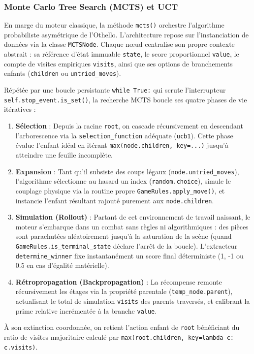 \documentclass[a4paper]{article}
\begin{document}
\subsubsection{Monte Carlo Tree Search (MCTS) et UCT}
En marge du moteur classique, la méthode \texttt{mcts()} orchestre l'algorithme probabiliste asymétrique de l'Othello. L'architecture repose sur l'instanciation de données via la classe \texttt{MCTSNode}. Chaque nœud centralise son propre contexte abstrait : sa référence d'état immuable \texttt{state}, le score proportionnel \texttt{value}, le compte de visites empiriques \texttt{visits}, ainsi que ses options de branchements enfants (\texttt{children} ou \texttt{untried\_moves}).

Répétée par une boucle persistante \texttt{while True:} qui scrute l'interrupteur \texttt{self.stop\_event.is\_set()}, la recherche MCTS boucle ses quatre phases de vie itératives :
\begin{enumerate}
    \item \textbf{Sélection} : Depuis la racine \texttt{root}, on cascade récursivement en descendant l'arborescence via la \texttt{selection\_function} adéquate (\texttt{ucb1}). Cette phase évalue l'enfant idéal en itérant \texttt{max(node.children, key=...)} jusqu'à atteindre une feuille incomplète.
    \item \textbf{Expansion} : Tant qu'il subsiste des coups légaux (\texttt{node.untried\_moves}), l'algorithme sélectionne au hasard un index (\texttt{random.choice}), simule le couplage physique via la routine propre \texttt{GameRules.apply\_move()}, et instancie l'enfant résultant rajouté purement aux \texttt{node.children}.
    \item \textbf{Simulation (Rollout)} : Partant de cet environnement de travail naissant, le moteur s'embarque dans un combat sans règles ni algorithmiques : des pièces sont parachutées aléatoirement jusqu'à la saturation de la scène (quand \texttt{GameRules.is\_terminal\_state} déclare l'arrêt de la boucle). L'extracteur \texttt{determine\_winner} fixe instantanément un score final déterministe (1, -1 ou 0.5 en cas d'égalité matérielle).
    \item \textbf{Rétropropagation (Backpropagation)} : La récompense remonte récursivement les étages via la propriété parentale (\texttt{temp\_node.parent}), actualisant le total de simulation \texttt{visits} des parents traversés, et calibrant la prime relative incrémentée à la branche \texttt{value}.
\end{enumerate}
À son extinction coordonnée, on retient l'action enfant de \texttt{root} bénéficiant du ratio de visites majoritaire calculé par \texttt{max(root.children, key=lambda c: c.visits)}.
\end{document}
